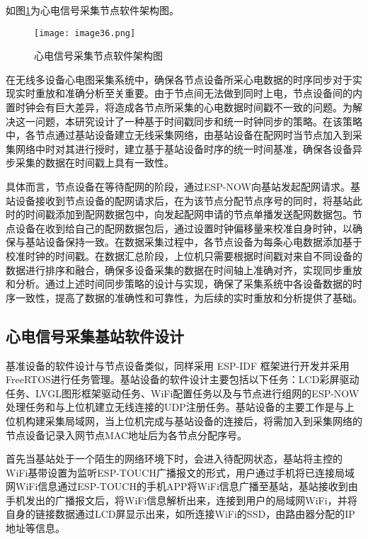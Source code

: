 如图\ref{F.ECG_image36}为心电信号采集节点软件架构图。

\begin{figure}[htb]
    \centering
    \texttt{[image: image36.png]}
    \caption{心电信号采集节点软件架构图}
    \label{F.ECG_image36}
\end{figure}

在无线多设备心电图采集系统中，确保各节点设备所采心电数据的时序同步对于实现实时重放和准确分析至关重要。由于节点间无法做到同时上电，节点设备间的内置时钟会有巨大差异，将造成各节点所采集的心电数据时间戳不一致的问题。为解决这一问题，本研究设计了一种基于时间戳同步和统一时钟同步的策略。在该策略中，各节点通过基站设备建立无线采集网络，由基站设备在配网时当节点加入到采集网络中时对其进行授时，建立基于基站设备时序的统一时间基准，确保各设备异步采集的数据在时间戳上具有一致性。

具体而言，节点设备在等待配网的阶段，通过ESP-NOW向基站发起配网请求。基站设备接收到节点设备的配网请求后，在为该节点分配节点序号的同时，将基站此时的时间戳添加到配网数据包中，向发起配网申请的节点单播发送配网数据包。节点设备在收到给自己的配网数据包后，通过设置时钟偏移量来校准自身时钟，以确保与基站设备保持一致。在数据采集过程中，各节点设备为每条心电数据添加基于校准时钟的时间戳。在数据汇总阶段，上位机只需要根据时间戳对来自不同设备的数据进行排序和融合，确保多设备采集的数据在时间轴上准确对齐，实现同步重放和分析。通过上述时间同步策略的设计与实现，确保了采集系统中各设备数据的时序一致性，提高了数据的准确性和可靠性，为后续的实时重放和分析提供了基础。

\newpage    %

\subsection{心电信号采集基站软件设计}

基准设备的软件设计与节点设备类似，同样采用 ESP-IDF 框架进行开发并采用FreeRTOS进行任务管理。基站设备的软件设计主要包括以下任务：LCD彩屏驱动任务、LVGL图形框架驱动任务、WiFi配置任务以及与节点进行组网的ESP-NOW处理任务和与上位机建立无线连接的UDP注册任务。基站设备的主要工作是与上位机构建采集局域网，当上位机完成与基站设备的连接后，将需加入到采集网络的节点设备记录入网节点MAC地址后为各节点分配序号。

首先当基站处于一个陌生的网络环境下时，会进入待配网状态，基站将主控的WiFi基带设置为监听ESP-TOUCH广播报文的形式，用户通过手机将已连接局域网WiFi信息通过ESP-TOUCH的手机APP将WiFi信息广播至基站，基站接收到由手机发出的广播报文后，将WiFi信息解析出来，连接到用户的局域网WiFi，并将自身的链接数据通过LCD屏显示出来，如所连接WiFi的SSD，由路由器分配的IP地址等信息。

